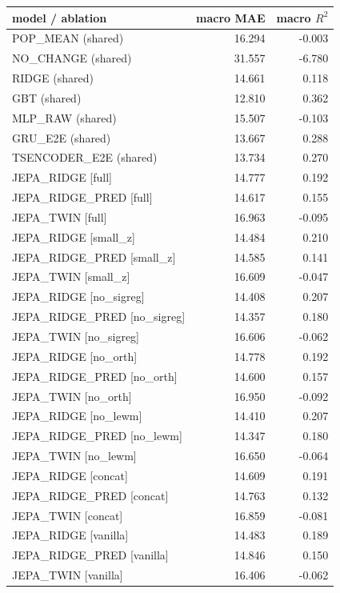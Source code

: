 \begin{tabular}{lrr}
\toprule
model / ablation & macro MAE & macro $R^2$ \\
\midrule
POP\_MEAN (shared) & 16.294 & -0.003 \\
NO\_CHANGE (shared) & 31.557 & -6.780 \\
RIDGE (shared) & 14.661 & 0.118 \\
GBT (shared) & 12.810 & 0.362 \\
MLP\_RAW (shared) & 15.507 & -0.103 \\
GRU\_E2E (shared) & 13.667 & 0.288 \\
TSENCODER\_E2E (shared) & 13.734 & 0.270 \\
\midrule
JEPA\_RIDGE [full] & 14.777 & 0.192 \\
JEPA\_RIDGE\_PRED [full] & 14.617 & 0.155 \\
JEPA\_TWIN [full] & 16.963 & -0.095 \\
JEPA\_RIDGE [small\_z] & 14.484 & 0.210 \\
JEPA\_RIDGE\_PRED [small\_z] & 14.585 & 0.141 \\
JEPA\_TWIN [small\_z] & 16.609 & -0.047 \\
JEPA\_RIDGE [no\_sigreg] & 14.408 & 0.207 \\
JEPA\_RIDGE\_PRED [no\_sigreg] & 14.357 & 0.180 \\
JEPA\_TWIN [no\_sigreg] & 16.606 & -0.062 \\
JEPA\_RIDGE [no\_orth] & 14.778 & 0.192 \\
JEPA\_RIDGE\_PRED [no\_orth] & 14.600 & 0.157 \\
JEPA\_TWIN [no\_orth] & 16.950 & -0.092 \\
JEPA\_RIDGE [no\_lewm] & 14.410 & 0.207 \\
JEPA\_RIDGE\_PRED [no\_lewm] & 14.347 & 0.180 \\
JEPA\_TWIN [no\_lewm] & 16.650 & -0.064 \\
JEPA\_RIDGE [concat] & 14.609 & 0.191 \\
JEPA\_RIDGE\_PRED [concat] & 14.763 & 0.132 \\
JEPA\_TWIN [concat] & 16.859 & -0.081 \\
JEPA\_RIDGE [vanilla] & 14.483 & 0.189 \\
JEPA\_RIDGE\_PRED [vanilla] & 14.846 & 0.150 \\
JEPA\_TWIN [vanilla] & 16.406 & -0.062 \\
\bottomrule
\end{tabular}